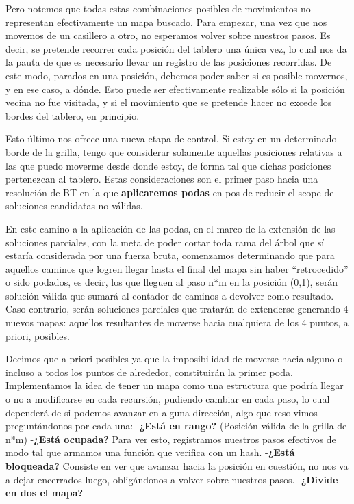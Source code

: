 \documentclass[./main.tex]{subfiles}
\begin{document}
Pero notemos que todas estas combinaciones posibles de movimientos no representan efectivamente un mapa buscado. Para empezar, una vez que nos movemos de un casillero a otro, no esperamos volver sobre nuestros pasos. Es decir, se pretende recorrer cada posición del tablero una única vez, lo cual nos da la pauta de que es necesario llevar un registro de las posiciones recorridas. 
De este modo, parados en una posición, debemos poder saber si es posible movernos, y en ese caso, a dónde. Esto puede ser efectivamente realizable sólo si la posición vecina no fue visitada, y si el movimiento que se pretende hacer no excede los bordes del tablero, en principio.\newline

Esto último nos ofrece una nueva etapa de control. Si estoy en un determinado borde de la grilla, tengo que considerar solamente aquellas posiciones relativas a las que puedo moverme desde donde estoy, de forma tal que dichas posiciones pertenezcan al tablero. Estas consideraciones son el primer paso hacia una resolución de BT en la que \textbf{aplicaremos podas} en pos de reducir el scope de soluciones candidatas-no válidas. \newline

En este camino a la aplicación de las podas, en el marco de la extensión de las soluciones parciales, con la meta de poder cortar toda rama del árbol que sí estaría considerada por una fuerza bruta, comenzamos determinando que para aquellos caminos que logren llegar hasta el final del mapa sin haber ``retrocedido'' o sido podados, es decir, los que lleguen al paso n*m en la posición (0,1), serán solución válida que sumará al contador de caminos a devolver como resultado.  Caso contrario, serán soluciones parciales que tratarán de extenderse generando 4 nuevos mapas: aquellos resultantes de moverse hacia cualquiera de los 4 puntos, a priori, posibles. \newline


Decimos que a priori posibles ya que la imposibilidad de moverse hacia alguno o incluso a todos los puntos de alrededor, constituirán la primer poda. Implementamos la idea de tener un mapa como una estructura que podría llegar o no a modificarse en cada recursión, pudiendo cambiar en cada paso, lo cual dependerá de si podemos avanzar en alguna dirección, algo que resolvimos preguntándonos por cada una: \newline\newline
-\textbf{¿Está en rango?} (Posición válida de la grilla de n*m)\newline
-\textbf{¿Está ocupada?} Para ver esto, registramos nuestros pasos efectivos de modo tal que armamos una función que verifica con un hash.\newline
-\textbf{¿Está bloqueada?} Consiste en ver que avanzar hacia la posición en cuestión, no nos va a dejar encerrados luego, obligándonos a volver sobre nuestros pasos.\newline
-\textbf{¿Divide en dos el mapa?} \newline\newline
\end{document}
